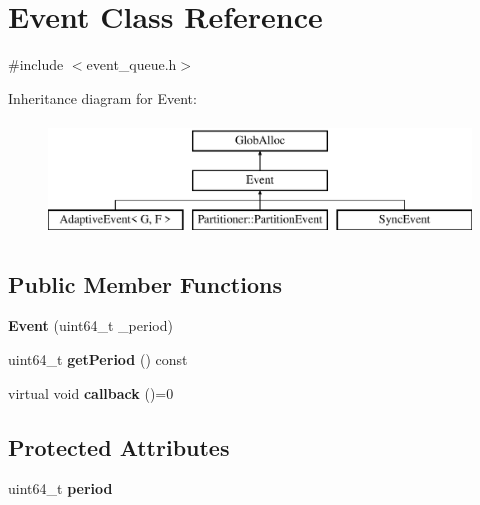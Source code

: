 \hypertarget{classEvent}{\section{Event Class Reference}
\label{classEvent}
}


{\ttfamily \#include $<$event\-\_\-queue.\-h$>$}

Inheritance diagram for Event\-:\begin{figure}[H]
\begin{center}
\leavevmode
\includegraphics[height=3.000000cm]{classEvent}
\end{center}
\end{figure}
\subsection*{Public Member Functions}
\begin{DoxyCompactItemize}
\item 
\hypertarget{classEvent_a30314db1ee1d302e652b4fbdc6fd014f}{{\bfseries Event} (uint64\-\_\-t \-\_\-period)}\label{classEvent_a30314db1ee1d302e652b4fbdc6fd014f}

\item 
\hypertarget{classEvent_ab04472aa7d4a60a2c52edae3ed12cef2}{uint64\-\_\-t {\bfseries get\-Period} () const }\label{classEvent_ab04472aa7d4a60a2c52edae3ed12cef2}

\item 
\hypertarget{classEvent_a625651166eae427187cdc0c351a41315}{virtual void {\bfseries callback} ()=0}\label{classEvent_a625651166eae427187cdc0c351a41315}

\end{DoxyCompactItemize}
\subsection*{Protected Attributes}
\begin{DoxyCompactItemize}
\item 
\hypertarget{classEvent_a48c0276ea0ab0cc4043161bff53b145d}{uint64\-\_\-t {\bfseries period}}\label{classEvent_a48c0276ea0ab0cc4043161bff53b145d}

\end{DoxyCompactItemize}


